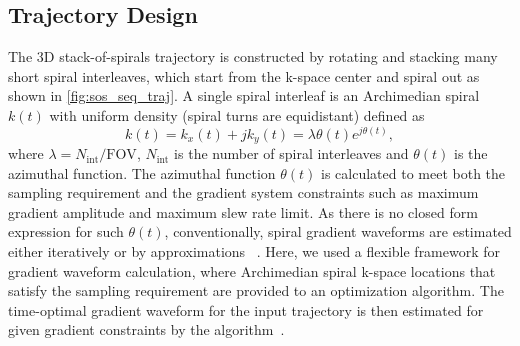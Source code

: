 \subsection{Trajectory Design}
The 3D stack-of-spirals trajectory is constructed by rotating and stacking many short spiral interleaves, which start from the k-space center and spiral out as shown in \cref{fig:sos_seq_traj}. A single spiral interleaf is an Archimedian spiral $k(t)$ with uniform density (spiral turns are equidistant) defined as    
\begin{equation}
	k(t)=k_x(t)+jk_y(t)=\lambda\theta(t) e^{j\theta(t)},
\end{equation} 
where $\lambda=N_\text{int}/\text{FOV}$, $N_\text{int}$ is the number of spiral interleaves and $\theta(t)$ is the azimuthal function.  The azimuthal function $\theta(t)$ is calculated to meet both the sampling requirement and the gradient system constraints such as maximum gradient amplitude and maximum slew rate limit. As there is no closed form expression for such $\theta(t)$, conventionally, spiral gradient waveforms are estimated either iteratively or by approximations  ~\cite{gloverSpiralImagingFMRI2012,duynFastSpiralMagnetic1997,gloverSimpleAnalyticSpiral1999}. Here, we used a flexible framework for gradient waveform calculation, where Archimedian spiral k-space locations that satisfy the sampling requirement are provided to an optimization algorithm. The time-optimal gradient waveform for the input trajectory is then estimated for given gradient constraints by the algorithm~\cite{lustigFastMethodDesigning2008}.

